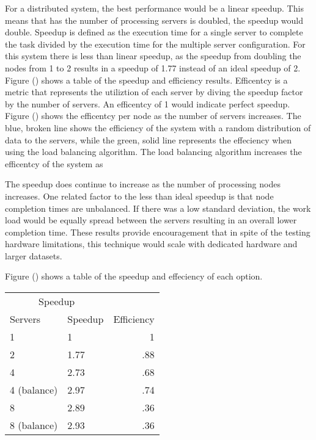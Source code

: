 \documentclass{article}
\begin{document}
\begin{multicols}{2}
For a distributed system, the best performance would be a linear speedup.  This means that has the number of processing servers is doubled, the speedup would double. Speedup is defined as the execution time for a single server to complete the task divided by the execution time for the multiple server configuration.  For this system there is less than linear speedup, as the speedup from doubling the nodes from 1 to 2 results in a speedup of 1.77 instead of an ideal speedup of 2.  Figure () shows a table of the speedup and efficiency results.  Efficentcy is a metric that represents the utiliztion of each server by diving the speedup factor by the number of servers.  An efficentcy of 1 would indicate perfect speedup.  Figure () shows the efficentcy per node as the number of servers increases.  The blue, broken line shows the efficiency of the system with a random distribution of data to the servers, while the green, solid line represents the effeciency when using the load balancing algorithm.  The load balancing algorithm increases the efficentcy of the system as 


The speedup does continue to increase as the number of processing nodes increases. One related factor to the less than ideal speedup is that node completion times are unbalanced. If there was a low standard deviation, the work load would be equally spread between the servers resulting in an overall lower completion time.  %
These results provide encouragement that in spite of the testing hardware limitations, this technique would scale with dedicated hardware and larger datasets.






Figure () shows a table of the speedup and effeciency of each option.




\begin{tabular}{llr}
\hline
\multicolumn{2}{c}{Speedup} \\
\cline{1-2}
Servers    & Speedup & Efficiency  \\
\hline
1     &  1  & 1   \\
2     &   1.77  & .88  \\
4     &   2.73  & .68 \\
4 (balance) & 2.97 & .74     \\
8 &  2.89   & .36  \\
8 (balance) & 2.93 & .36      \\
\hline
\end{tabular}


\end{multicols}
\end{document}
